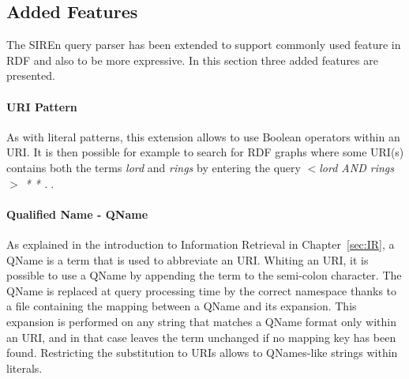 \subsection{Added Features}

The SIREn query parser has been extended to support commonly used feature in
RDF and also to be more expressive. In this section three added features are
presented.

\paragraph{URI Pattern}

As with literal patterns, this extension allows to use Boolean operators within
an URI. It is then possible for example to search for RDF graphs where some
URI(s) contains both the terms \emph{lord} and \emph{rings} by entering the
query \emph{$<$lord AND rings$>$ * * .}$\;$.

\paragraph{Qualified Name - QName}

As explained in the introduction to Information Retrieval in
Chapter~\ref{sec:IR}, a QName is a term that is used to abbreviate an URI.
Whiting an URI, it is possible to use a QName by appending the term to the
semi-colon character. The QName is replaced at query processing time by the
correct namespace thanks to a file containing the mapping between a QName and
its expansion.
This expansion is performed on any string that matches a QName format only
within an URI, and in that case leaves the term unchanged if no mapping key has
been found. Restricting the substitution to URIs allows to QNames-like strings
within literals.

